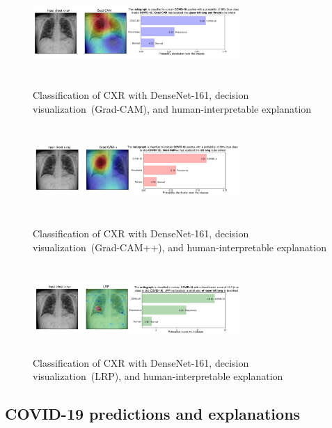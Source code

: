 \documentclass[conference]{IEEEtran}
\begin{document}
\begin{figure}
    	\vspace{-2mm}
	\centering
    	\includegraphics[width=0.7\textwidth,height=33.75mm]{samples/gcam.pdf}
    	\caption{Classification of CXR with DenseNet-161, decision visualization~(Grad-CAM), and human-interpretable explanation}
    	\label{Fig:ggcam_viz}
    	\smallskip
    	\includegraphics[width=0.7\textwidth,height=33.75mm]{samples/gcampp.pdf}
    	\caption{Classification of CXR with DenseNet-161, decision visualization~(Grad-CAM++), and human-interpretable explanation}
    	\label{Fig:ggcam_plus_viz}
    	\smallskip
    	\includegraphics[width=0.7\textwidth,height=33.75mm]{samples/lrp.pdf}
    	\caption{Classification of CXR with DenseNet-161, decision visualization~(LRP), and human-interpretable explanation}
    	\label{Fig:lrp_viz}
    	\vspace{-4mm}
\end{figure}

\subsection{COVID-19 predictions and explanations}
\label{sub:expl}
\end{document}
